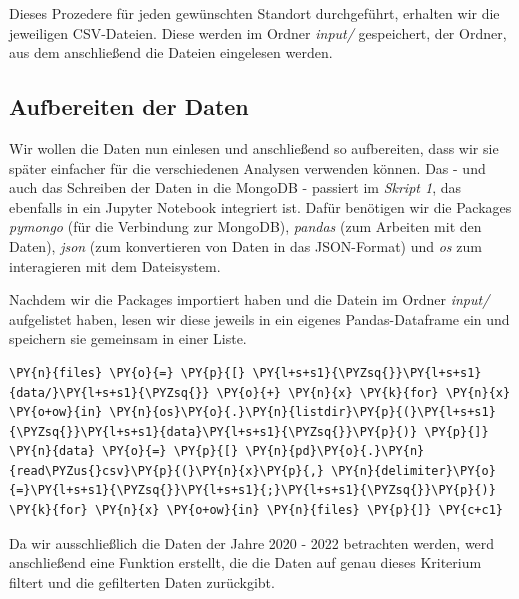 Dieses Prozedere für jeden gewünschten Standort durchgeführt, erhalten wir die jeweiligen CSV-Dateien. Diese werden im Ordner \emph{input/} gespeichert, der Ordner, aus dem anschließend die Dateien eingelesen werden.

\subsection{Aufbereiten der Daten}
Wir wollen die Daten nun einlesen und anschließend so aufbereiten, dass wir sie später einfacher für die verschiedenen Analysen verwenden können. Das - und auch das Schreiben der Daten in die MongoDB - passiert im \emph{Skript 1}, das ebenfalls in ein Jupyter Notebook integriert ist. Dafür benötigen wir die Packages \emph{pymongo} (für die Verbindung zur MongoDB), \emph{pandas} (zum Arbeiten mit den Daten), \emph{json} (zum konvertieren von Daten in das JSON-Format) und \emph{os} zum interagieren mit dem Dateisystem.
\bigbreak

Nachdem wir die Packages importiert haben und die Datein im Ordner \emph{input/} aufgelistet haben, lesen wir diese jeweils in ein eigenes Pandas-Dataframe ein und speichern sie gemeinsam in einer Liste.

\bigbreak
\begin{tcolorbox}[breakable, size=fbox, boxrule=1pt, pad at break*=1mm,colback=cellbackground, colframe=cellborder]
\begin{Verbatim}[commandchars=\\\{\}]
\PY{n}{files} \PY{o}{=} \PY{p}{[} \PY{l+s+s1}{\PYZsq{}}\PY{l+s+s1}{data/}\PY{l+s+s1}{\PYZsq{}} \PY{o}{+} \PY{n}{x} \PY{k}{for} \PY{n}{x} \PY{o+ow}{in} \PY{n}{os}\PY{o}{.}\PY{n}{listdir}\PY{p}{(}\PY{l+s+s1}{\PYZsq{}}\PY{l+s+s1}{data}\PY{l+s+s1}{\PYZsq{}}\PY{p}{)} \PY{p}{]}
\PY{n}{data} \PY{o}{=} \PY{p}{[} \PY{n}{pd}\PY{o}{.}\PY{n}{read\PYZus{}csv}\PY{p}{(}\PY{n}{x}\PY{p}{,} \PY{n}{delimiter}\PY{o}{=}\PY{l+s+s1}{\PYZsq{}}\PY{l+s+s1}{;}\PY{l+s+s1}{\PYZsq{}}\PY{p}{)} \PY{k}{for} \PY{n}{x} \PY{o+ow}{in} \PY{n}{files} \PY{p}{]} \PY{c+c1}
\end{Verbatim}
\end{tcolorbox}
\bigbreak

Da wir ausschließlich die Daten der Jahre 2020 - 2022 betrachten werden, werd anschließend eine Funktion erstellt, die die Daten auf genau dieses Kriterium filtert und die gefilterten Daten zurückgibt.

